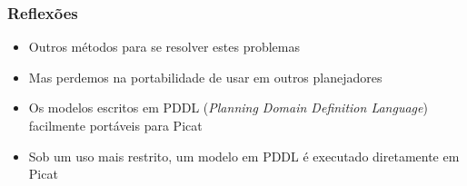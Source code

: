 \begin{frame}[fragile]
\frametitle{Reflexões}


\begin{itemize}
  \item Outros métodos para se resolver estes problemas
  \pause
  \item Mas perdemos na portabilidade de usar em outros planejadores
  \pause
  \item Os modelos escritos em PDDL (\textit{Planning Domain Definition Language})
  facilmente portáveis para Picat
    \pause
  \item Sob um uso mais restrito, um modelo em PDDL é executado diretamente em Picat
\end{itemize}

\end{frame}



